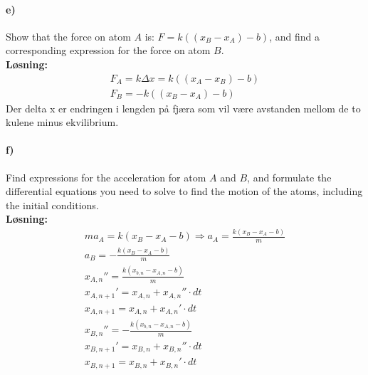 \documentclass[11pt, A4paper,norsk]{article}
\begin{document}
		\paragraph{e)}
			\begin{flushleft}
Show that the force on atom $A$ is: $F = k((x_B - x_A) - b)$, and find a corresponding expression for the force on atom $B$. \\
\vspace{1mm}
\textbf{Løsning:} \\
\vspace{1mm}
				\begin{align}
F_A = k \Delta x = k((x_A - x_B) - b) \nonumber \\
F_B = - k((x_B - x_A) - b) \nonumber
				\end{align}
Der delta x er endringen i lengden på fjæra som vil være avstanden mellom de to kulene minus ekvilibrium.
			\end{flushleft}









		\paragraph{f)}
			\begin{flushleft}
Find expressions for the acceleration for atom $A$ and $B$, and formulate the differential equations you need to solve to find the motion of the atoms, including the initial conditions. \\
\vspace{1mm}
\textbf{Løsning:} \\
\vspace{1mm}
				\begin{align}
ma_A = k(x_B - x_A - b) \Rightarrow a_A = \frac{k(x_B - x_A - b)}{m} \nonumber \\
a_B = - \frac{k(x_B - x_A - b)}{m} \nonumber \\
x_{A,n}'' = \frac{k(x_{b,n} - x_{A,n} - b)}{m} \nonumber \\
x_{A,n+1}' = x_{A,n} + x_{A,n}'' \cdot dt \nonumber \\
x_{A,n+1} = x_{A,n} + x_{A,n}' \cdot dt \nonumber \\
x_{B,n}'' = - \frac{k(x_{b,n} - x_{A,n} - b)}{m} \nonumber \\
x_{B,n+1}' = x_{B,n} + x_{B,n}'' \cdot dt \nonumber \\
x_{B,n+1} = x_{B,n} + x_{B,n}' \cdot dt \nonumber
				\end{align}
			\end{flushleft}
\end{document}
